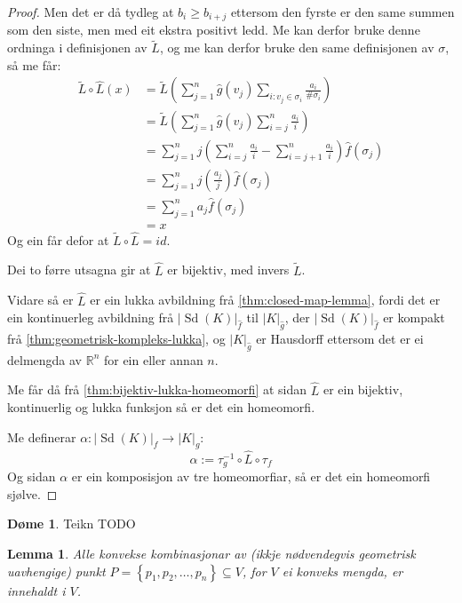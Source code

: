 \documentclass[a4paper, 12pt, norsk]{article}
\theoremstyle{plain}
\newtheorem{lemma}[theorem]{Lemma}
\theoremstyle{definition}
\newtheorem{example}[theorem]{Døme}
\newcommand{\Rb}{\mathbb{R}}
\newcommand{\gr}[1]{ \lvert #1 \rvert } %
\newcommand{\set}[1]{ \left \{ #1 \right \} } %
\newcommand{\tuple}[1]{ \left( #1 \right) } %
\DeclareMathOperator{\Sd}{Sd}
\begin{document}
\begin{proof}
	Men det er då tydleg at \( b_i \geq b_{i+j} \) ettersom den fyrste er den same summen som den siste, men med eit ekstra positivt ledd. Me kan derfor bruke denne ordninga i definisjonen av \( \tilde{L} \), og me kan derfor bruke den same definisjonen av \( \sigma \), så me får:
	\begin{align*}
		\tilde{L}\circ\hat{L}(x) &= \tilde{L}\tuple{\sum_{j=1}^n \hat{g}(v_j) \sum_{i:v_j\in\sigma_i}\frac{a_i}{\#\sigma_i}} \\
		&= \tilde{L}\tuple{\sum_{j=1}^n \hat{g}(v_j) \sum_{i=j}^n \frac{a_i}{i}} \\
		&= \sum_{j=1}^n j\tuple{\sum_{i=j}^n \frac{a_i}{i} - \sum_{i=j+1}^n \frac{a_i}{i}}\hat{f}(\sigma_j) \\
		&= \sum_{j=1}^n j\tuple{\frac{a_j}{j}}\hat{f}(\sigma_j) \\
		&= \sum_{j=1}^n a_j \hat{f}(\sigma_j) \\
		&= x
	\end{align*}
	Og ein får defor at \( \tilde{L}\circ\hat{L} = id \). 
	
	Dei to førre utsagna gir at \( \hat{L} \) er bijektiv, med invers \( \tilde{L} \).

	Vidare så er \( \hat{L} \) er ein lukka avbildning frå \autoref{thm:closed-map-lemma}, fordi det er ein kontinuerleg avbildning frå \( \gr{\Sd(K)}_{\hat{f}} \) til \( \gr{K}_{\hat{g}} \), der \( \gr{\Sd(K)}_{\hat{f}} \) er kompakt frå \autoref{thm:geometrisk-kompleks-lukka}, og  \( \gr{K}_{\hat{g}} \) er Hausdorff ettersom det er ei delmengda av \( \Rb^n \) for ein eller annan \( n \).

	Me får då frå \autoref{thm:bijektiv-lukka-homeomorfi} at sidan \( \hat{L} \) er ein bijektiv, kontinuerlig og lukka funksjon så er det ein homeomorfi.

	Me definerar \( \alpha: \gr{\Sd(K)}_f \to \gr{K}_g \):
	\[
		\alpha := \tau_g^{-1} \circ \hat{L} \circ \tau_f
	\]
	Og sidan \( \alpha \) er ein komposisjon av tre homeomorfiar, så er det ein homeomorfi sjølve.
\end{proof}

\begin{example}
	Teikn TODO
\end{example}

\begin{lemma} \label{thm:konveks-kombinasjon-i-konveks}
	Alle konvekse kombinasjonar av (ikkje nødvendegvis geometrisk uavhengige) punkt \( P = \set{p_1, p_2, \dots, p_n } \subseteq V \), for \( V \) ei konveks mengda, er innehaldt i \( V \).
\end{lemma}
\end{document}
